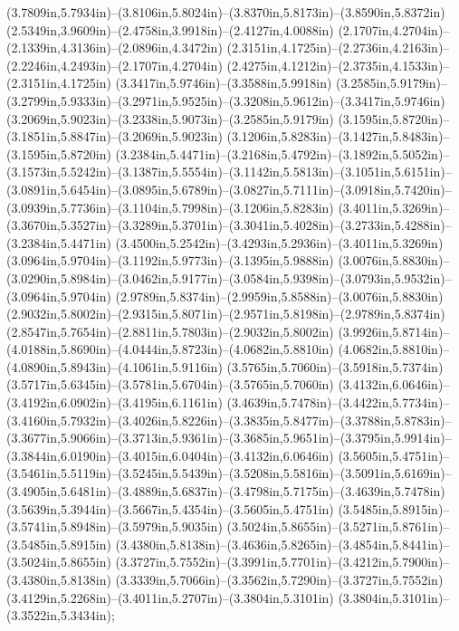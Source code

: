 (3.7809in,5.7934in)--(3.8106in,5.8024in)--(3.8370in,5.8173in)--(3.8590in,5.8372in) (2.5349in,3.9609in)--(2.4758in,3.9918in)--(2.4127in,4.0088in) (2.1707in,4.2704in)--(2.1339in,4.3136in)--(2.0896in,4.3472in) (2.3151in,4.1725in)--(2.2736in,4.2163in)--(2.2246in,4.2493in)--(2.1707in,4.2704in) (2.4275in,4.1212in)--(2.3735in,4.1533in)--(2.3151in,4.1725in) (3.3417in,5.9746in)--(3.3588in,5.9918in) (3.2585in,5.9179in)--(3.2799in,5.9333in)--(3.2971in,5.9525in)--(3.3208in,5.9612in)--(3.3417in,5.9746in) (3.2069in,5.9023in)--(3.2338in,5.9073in)--(3.2585in,5.9179in) (3.1595in,5.8720in)--(3.1851in,5.8847in)--(3.2069in,5.9023in) (3.1206in,5.8283in)--(3.1427in,5.8483in)--(3.1595in,5.8720in) (3.2384in,5.4471in)--(3.2168in,5.4792in)--(3.1892in,5.5052in)--(3.1573in,5.5242in)--(3.1387in,5.5554in)--(3.1142in,5.5813in)--(3.1051in,5.6151in)--(3.0891in,5.6454in)--(3.0895in,5.6789in)--(3.0827in,5.7111in)--(3.0918in,5.7420in)--(3.0939in,5.7736in)--(3.1104in,5.7998in)--(3.1206in,5.8283in) (3.4011in,5.3269in)--(3.3670in,5.3527in)--(3.3289in,5.3701in)--(3.3041in,5.4028in)--(3.2733in,5.4288in)--(3.2384in,5.4471in) (3.4500in,5.2542in)--(3.4293in,5.2936in)--(3.4011in,5.3269in) (3.0964in,5.9704in)--(3.1192in,5.9773in)--(3.1395in,5.9888in) (3.0076in,5.8830in)--(3.0290in,5.8984in)--(3.0462in,5.9177in)--(3.0584in,5.9398in)--(3.0793in,5.9532in)--(3.0964in,5.9704in) (2.9789in,5.8374in)--(2.9959in,5.8588in)--(3.0076in,5.8830in) (2.9032in,5.8002in)--(2.9315in,5.8071in)--(2.9571in,5.8198in)--(2.9789in,5.8374in) (2.8547in,5.7654in)--(2.8811in,5.7803in)--(2.9032in,5.8002in) (3.9926in,5.8714in)--(4.0188in,5.8690in)--(4.0444in,5.8723in)--(4.0682in,5.8810in) (4.0682in,5.8810in)--(4.0890in,5.8943in)--(4.1061in,5.9116in) (3.5765in,5.7060in)--(3.5918in,5.7374in) (3.5717in,5.6345in)--(3.5781in,5.6704in)--(3.5765in,5.7060in) (3.4132in,6.0646in)--(3.4192in,6.0902in)--(3.4195in,6.1161in) (3.4639in,5.7478in)--(3.4422in,5.7734in)--(3.4160in,5.7932in)--(3.4026in,5.8226in)--(3.3835in,5.8477in)--(3.3788in,5.8783in)--(3.3677in,5.9066in)--(3.3713in,5.9361in)--(3.3685in,5.9651in)--(3.3795in,5.9914in)--(3.3844in,6.0190in)--(3.4015in,6.0404in)--(3.4132in,6.0646in) (3.5605in,5.4751in)--(3.5461in,5.5119in)--(3.5245in,5.5439in)--(3.5208in,5.5816in)--(3.5091in,5.6169in)--(3.4905in,5.6481in)--(3.4889in,5.6837in)--(3.4798in,5.7175in)--(3.4639in,5.7478in) (3.5639in,5.3944in)--(3.5667in,5.4354in)--(3.5605in,5.4751in) (3.5485in,5.8915in)--(3.5741in,5.8948in)--(3.5979in,5.9035in) (3.5024in,5.8655in)--(3.5271in,5.8761in)--(3.5485in,5.8915in) (3.4380in,5.8138in)--(3.4636in,5.8265in)--(3.4854in,5.8441in)--(3.5024in,5.8655in) (3.3727in,5.7552in)--(3.3991in,5.7701in)--(3.4212in,5.7900in)--(3.4380in,5.8138in) (3.3339in,5.7066in)--(3.3562in,5.7290in)--(3.3727in,5.7552in) (3.4129in,5.2268in)--(3.4011in,5.2707in)--(3.3804in,5.3101in) (3.3804in,5.3101in)--(3.3522in,5.3434in);

